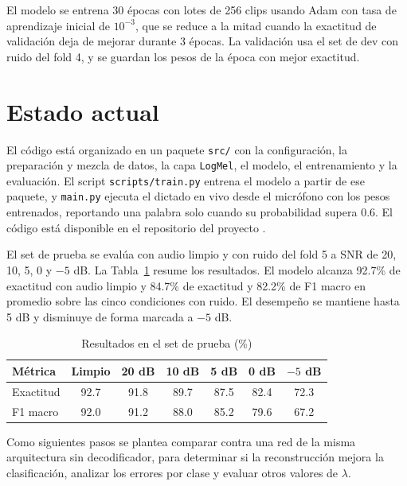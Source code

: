 \documentclass[conference]{IEEEtran}
\begin{document}
El modelo se entrena 30 épocas con lotes de 256 clips usando Adam \cite{b5} con tasa de aprendizaje inicial de $10^{-3}$, que se reduce a la mitad cuando la exactitud de validación deja de mejorar durante 3 épocas. La validación usa el set de dev con ruido del fold 4, y se guardan los pesos de la época con mejor exactitud.

\section{Estado actual}
El código está organizado en un paquete \texttt{src/} con la configuración, la preparación y mezcla de datos, la capa \texttt{LogMel}, el modelo, el entrenamiento y la evaluación. El script \texttt{scripts/train.py} entrena el modelo a partir de ese paquete, y \texttt{main.py} ejecuta el dictado en vivo desde el micrófono con los pesos entrenados, reportando una palabra solo cuando su probabilidad supera 0.6. El código está disponible en el repositorio del proyecto \cite{b8}.

El set de prueba se evalúa con audio limpio y con ruido del fold 5 a SNR de 20, 10, 5, 0 y $-5$ dB. La Tabla~\ref{tab:resultados} resume los resultados. El modelo alcanza 92.7\% de exactitud con audio limpio y 84.7\% de exactitud y 82.2\% de F1 macro en promedio sobre las cinco condiciones con ruido. El desempeño se mantiene hasta 5 dB y disminuye de forma marcada a $-5$ dB.

\begin{table}[htbp]
\caption{Resultados en el set de prueba (\%)}
\label{tab:resultados}
\centering
\small
\setlength{\tabcolsep}{3pt}
\begin{tabular}{lcccccc}
\toprule
Métrica & Limpio & 20 dB & 10 dB & 5 dB & 0 dB & $-5$ dB \\
\midrule
Exactitud & 92.7 & 91.8 & 89.7 & 87.5 & 82.4 & 72.3 \\
F1 macro & 92.0 & 91.2 & 88.0 & 85.2 & 79.6 & 67.2 \\
\bottomrule
\end{tabular}
\end{table}

Como siguientes pasos se plantea comparar contra una red de la misma arquitectura sin decodificador, para determinar si la reconstrucción mejora la clasificación, analizar los errores por clase y evaluar otros valores de $\lambda$.
\end{document}
